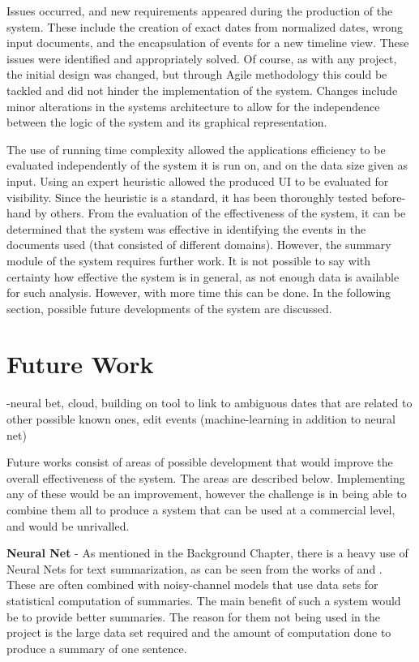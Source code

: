 \par Issues occurred, and new requirements appeared during the production of the system. These include the creation of exact dates from normalized dates, wrong input documents, and the encapsulation of events for a new timeline view. These issues were identified and appropriately solved. Of course, as with any project, the initial design was changed, but through Agile methodology this could be tackled and did not hinder the implementation of the system. Changes include minor alterations in the systems architecture to allow for the independence between the logic of the system and its graphical representation.

\par The use of running time complexity allowed the applications efficiency to be evaluated independently of the system it is run on, and on the data size given as input. Using an expert heuristic allowed the produced UI to be evaluated for visibility. Since the heuristic is a standard, it has been thoroughly tested before-hand by others. From the evaluation of the effectiveness of the system, it can be determined that the system was effective in identifying the events in the documents used (that consisted of different domains). However, the summary module of the system requires further work. It is not possible to say with certainty how effective the system is in general, as not enough data is available for such analysis. However, with more time this can be done. In the following section, possible future developments of the system are discussed.

\section{Future Work}
-neural bet, cloud, building on tool to link to ambiguous dates that are related to other possible known ones, edit events (machine-learning in addition to neural net)

\par Future works consist of areas of possible development that would improve the overall effectiveness of the system. The areas are described below. Implementing any of these would be an improvement, however the challenge is in being able to combine them all to produce a system that can be used at a commercial level, and would be unrivalled.

\par \textbf{Neural Net} - As mentioned in the Background Chapter, there is a heavy use of Neural Nets for text summarization, as can be seen from the works of \cite{chopraaulirush2016} and \cite{rushchopraweston2015}. These are often combined with noisy-channel models that use data sets for statistical computation of summaries. The main benefit of such a system would be to provide better summaries. The reason for them not being used in the project is the large data set required and the amount of computation done to produce a summary of one sentence.

